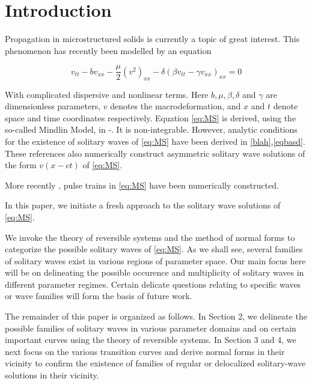 \section{Introduction}

Propagation in microstructured solids is currently a topic of great interest. This phenomenon has
recently been modelled \cite{basd} by an equation

\begin{equation}\label{eq:MS}
v_{tt} - b v_{xx} - \frac{\mu}{2} \left( v^2 \right)_{xx} - \delta \left( \beta v_{tt} - \gamma v_{xx}\right)_{xx} = 0 
\end{equation}

With complicated dispersive and nonlinear terms. Here $b, \mu, \beta, \delta$ and $\gamma$ are dimensionless
parameters, $v$ denotes the macrodeformation, and $x$ and $t$ denote space and time coordinates respectively.
Equation \eqref{eq:MS} is derived, using the so-called Mindlin Model, in \cite{basdf}-\cite{adsf}. 
It is non-integrable. However, analytic conditions for the existence of solitary waves of \eqref{eq:MS} have been 
derived in \eqref{blah},\eqref{eqbasd}. These references also numerically construct asymmetric solitary wave solutions of the form $ v\left(x - c t \right)$ of \eqref{eq:MS}.

More recently \cite{asdf} \cite{asdf} \cite{asdf} , pulse trains in \eqref{eq:MS} have been numerically constructed.

In this paper, we initiate a fresh approach to the solitary wave solutions of \eqref{eq:MS}.

We invoke the theory of reversible systems and the method of normal forms to categorize the possible solitary waves of \eqref{eq:MS}.
As we shall see, several families of solitary waves exist in various regions of parameter space. Our main focus here will be on 
delineating the possible occurence and multiplicity of solitary waves in different parameter regimes. Certain delicate questions
relating to specific waves or wave families will form the basis of future work. 

The remainder of this paper is organized as follows. In Section 2, we delineate the possible families of solitary waves
in various parameter domains and on certain important curves using the theory of reversible systems. In Section 3 and 4, we next
focus on the various transition curves and derive normal forms in their vicinity to confirm the existence of families of 
regular or delocalized solitary-wave solutions in their vicinity.
